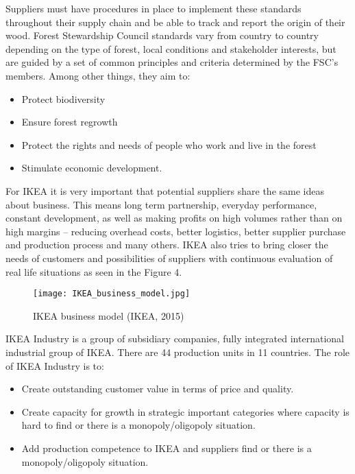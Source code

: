 \documentclass[oneside,12pt]{article}%
\begin{document}
Suppliers must have procedures in place to implement these standards throughout their supply chain and be able to track and report the origin of their wood.
Forest Stewardship Council standards vary from country to country depending on the type of forest, local conditions and stakeholder interests, but are guided by a set of common principles and criteria determined by the FSC’s members. Among other things, they aim to:

\begin{itemize}
  \item Protect biodiversity
  \item Ensure forest regrowth
  \item Protect the rights and needs of people who work and live in the forest
  \item Stimulate economic development.
\end{itemize}


For IKEA it is very important that potential suppliers share the same ideas about business. This means long term partnership, everyday performance, constant development, as well as making profits on high volumes rather than on high margins – reducing overhead costs, better logistics, better supplier purchase and production process and many others. IKEA also tries to bring closer the needs of customers and possibilities of suppliers with continuous evaluation of real life situations as seen in the Figure 4.


\begin{figure}[ht!]
  \texttt{[image: IKEA\_business\_model.jpg]}
  \caption{IKEA business model (IKEA, 2015)}
\end{figure}



IKEA Industry is a group of subsidiary companies, fully integrated international industrial group of IKEA. There are 44 production units in 11 countries.
The role of IKEA Industry is to:
\begin{itemize}
  \item Create outstanding customer value in terms of price and quality.
  \item Create capacity for growth in strategic important categories where capacity is hard to find or there is a monopoly/oligopoly situation.
  \item Add production competence to IKEA and suppliers find or there is a monopoly/oligopoly situation.

\end{itemize}
\end{document}
